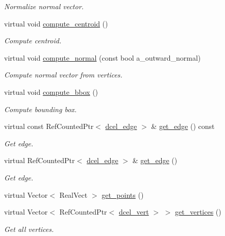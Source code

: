 \begin{DoxyCompactItemize}
\begin{DoxyCompactList}\small\item\em Normalize normal vector. \end{DoxyCompactList}\item 
virtual void \hyperlink{classdcel__poly_aced82b45b505feb23bbd559916631d7b}{compute\+\_\+centroid} ()
\begin{DoxyCompactList}\small\item\em Compute centroid. \end{DoxyCompactList}\item 
virtual void \hyperlink{classdcel__poly_a1880b7566efe535e71e0e6fa0bc76111}{compute\+\_\+normal} (const bool a\+\_\+outward\+\_\+normal)
\begin{DoxyCompactList}\small\item\em Compute normal vector from vertices. \end{DoxyCompactList}\item 
virtual void \hyperlink{classdcel__poly_a8acc8df2344ad21505a8b9c83f56f411}{compute\+\_\+bbox} ()
\begin{DoxyCompactList}\small\item\em Compute bounding box. \end{DoxyCompactList}\item 
virtual const Ref\+Counted\+Ptr$<$ \hyperlink{classdcel__edge}{dcel\+\_\+edge} $>$ \& \hyperlink{classdcel__poly_a7b3ebff6a83b762892c8da0a796df587}{get\+\_\+edge} () const 
\begin{DoxyCompactList}\small\item\em Get edge. \end{DoxyCompactList}\item 
virtual Ref\+Counted\+Ptr$<$ \hyperlink{classdcel__edge}{dcel\+\_\+edge} $>$ \& \hyperlink{classdcel__poly_a67cc2fb9af5e316b231c34c82a957dd1}{get\+\_\+edge} ()
\begin{DoxyCompactList}\small\item\em Get edge. \end{DoxyCompactList}\item 
virtual Vector$<$ Real\+Vect $>$ \hyperlink{classdcel__poly_a6e6072f31cfd0714f968e7f3b5014535}{get\+\_\+points} ()
\item 
virtual Vector$<$ Ref\+Counted\+Ptr$<$ \hyperlink{classdcel__vert}{dcel\+\_\+vert} $>$ $>$ \hyperlink{classdcel__poly_a319f91c4df2500dbafa99be81538102f}{get\+\_\+vertices} ()
\begin{DoxyCompactList}\small\item\em Get all vertices. \end{DoxyCompactList}\item 

\end{DoxyCompactItemize}
